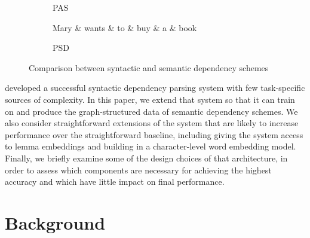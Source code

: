 \documentclass[11pt,a4paper]{article}
\begin{document}
\begin{figure*}
\begin{subfigure}[b]{.24\textwidth}
\begin{dependency}[label style={font=\scshape}]
    \end{dependency}
    \caption{PAS}
    \label{PAS-wants}
  \end{subfigure}
  \begin{subfigure}[b]{.24\textwidth}
    \centering
    \begin{dependency}[label style={font=\scshape}]
      \begin{deptext}
        Mary \& wants \& to \& buy \& a \& book \\
      \end{deptext}
    \end{dependency}
    \caption{PSD}
    \label{PSD-wants}
  \end{subfigure}
  \caption{Comparison between syntactic and semantic dependency schemes}
  \label{comparison}
\end{figure*}

\citet{DozatManning2017} developed a successful syntactic dependency parsing system with few task-specific sources of complexity. In this paper, we extend that system so that it can train on and produce the graph-structured data of semantic dependency schemes. We also consider straightforward extensions of the system that are likely to increase performance over the straightforward baseline, including giving the system access to lemma embeddings and building in a character-level word embedding model. Finally, we briefly examine some of the design choices of that architecture, in order to assess which components are necessary for achieving the highest accuracy and which have little impact on final performance.

\section{Background}
\end{document}
